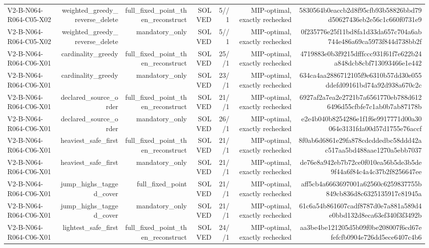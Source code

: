 {\begin{longtable}{lrrrrrr}
V2-B-N064-R064-C05-X02 & weighted\_greedy\_reverse\_delete & full\_fixed\_point\_then\_reconstruct & SOLVED & 5//1 & MIP-optimal, exactly rechecked & 5830564b0eaccb2d8f95cfb93b58826bbd79d50627436eb2e56c1c660f0731e9 \\
V2-B-N064-R064-C05-X02 & weighted\_greedy\_reverse\_delete & mandatory\_only & SOLVED & 5//1 & MIP-optimal, exactly rechecked & 0f235776e25f11bd8fa1d33da657c704a6ab744e486a69ca5973f844d738bb2f \\
V2-B-N064-R064-C06-X01 & cardinality\_greedy & full\_fixed\_point\_then\_reconstruct & SOLVED & 25//1 & MIP-optimal, exactly rechecked & 4719883e0b3f9215dfffccc931f61f7e622b24a848dcb8cbf713093466e1e442 \\
V2-B-N064-R064-C06-X01 & cardinality\_greedy & mandatory\_only & SOLVED & 23//1 & MIP-optimal, exactly rechecked & 634ca4aa2886712105f9e6310b57dd30e055ddefd09161bd74a92d938a670c2c \\
V2-B-N064-R064-C06-X01 & declared\_source\_order & full\_fixed\_point\_then\_reconstruct & SOLVED & 21//1 & MIP-optimal, exactly rechecked & 6927af2a7ea2e2721b7a6561770eb788d6126496d55cfbfe7c1ab0b7ab87178b \\
V2-B-N064-R064-C06-X01 & declared\_source\_order & mandatory\_only & SOLVED & 26//1 & MIP-optimal, exactly rechecked & e2e4b040b8254286e1f1f6e9917771d00a30064e3131fda00d57d1755e76accf \\
V2-B-N064-R064-C06-X01 & heaviest\_safe\_first & full\_fixed\_point\_then\_reconstruct & SOLVED & 21//1 & MIP-optimal, exactly rechecked & 8f0ab6d6861e29fa878cdcddedbc58ddd42ac517aa5bd488aae1270a5ebb7037 \\
V2-B-N064-R064-C06-X01 & heaviest\_safe\_first & mandatory\_only & SOLVED & 21//1 & MIP-optimal, exactly rechecked & de76e8a942eb7b72ce0f010ea56b5de3b5de9f44a6f84c4a4c37b2f8256647ee \\
V2-B-N064-R064-C06-X01 & jump\_highs\_tagged\_cover & full\_fixed\_point & SOLVED & 21//1 & MIP-optimal, exactly rechecked & aff5cb4a6663697001a62560c6259837755b849cb836d8c6325135917c81945a \\
V2-B-N064-R064-C06-X01 & jump\_highs\_tagged\_cover & mandatory\_only & SOLVED & 21//1 & MIP-optimal, exactly rechecked & 61c6a54b861607cadf8787d0e7a881a589d4e0bbd132d8eca63ef340f3f3492b \\
V2-B-N064-R064-C06-X01 & lightest\_safe\_first & full\_fixed\_point\_then\_reconstruct & SOLVED & 24//1 & MIP-optimal, exactly rechecked & aa3be4be121205d5b09f0be208007f6cd67efefcfb0904e726dd5ece6407c4b6 \\

\end{longtable}}
